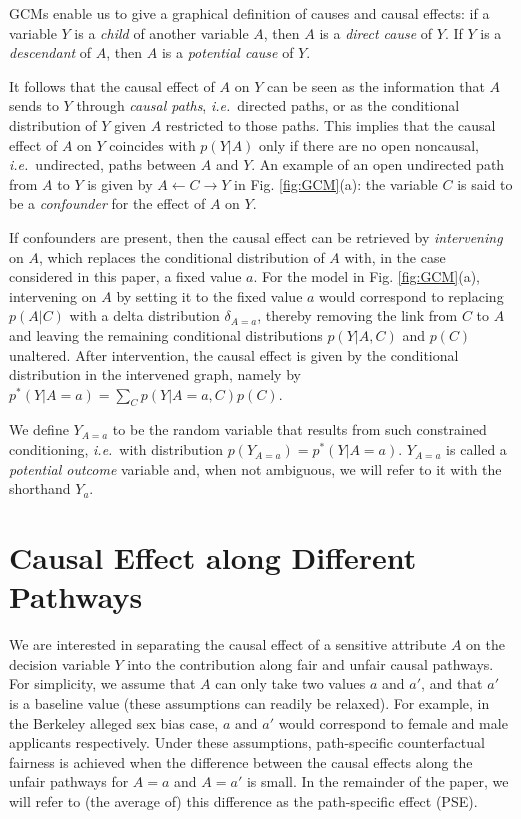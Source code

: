 \documentclass{article}
\newcommand{\figref}[1]{Fig. \ref{#1}}
\newcommand{\ie}{\emph{i.e.}}
\begin{document}
GCMs enable us to give a graphical definition of causes and causal effects: if a variable $Y$ is a \emph{child} of another variable $A$, then $A$ is a \emph{direct cause} of $Y$. 
If $Y$ is a \emph{descendant} of $A$, then $A$ is a \emph{potential cause} of $Y$. 

It follows that the causal effect of $A$ on $Y$ can be seen as the information that $A$ sends to $Y$ through \emph{causal paths}, \ie~directed paths,
or as the conditional distribution of $Y$ given $A$ restricted to those paths. This implies that the causal effect of $A$ on $Y$ coincides with $p(Y|A)$ only if 
there are no open noncausal, \ie~undirected, paths between $A$ and $Y$. An example of an open undirected path from $A$ to $Y$ is given by $A\leftarrow C \rightarrow Y$ in \figref{fig:GCM}(a): 
the variable $C$ is said to be a \emph{confounder} for the effect of $A$ on $Y$. 

If confounders are present, then the causal effect can be retrieved by \emph{intervening} on $A$, 
which replaces the conditional distribution of $A$ with, in the case considered in this paper, a fixed value $a$. 
For the model in \figref{fig:GCM}(a), intervening on $A$ by setting it to the fixed value $a$ would correspond to replacing $p(A|C)$ with a delta distribution $\delta_{A=a}$, thereby removing the link from $C$ to $A$ and leaving the remaining conditional distributions $p(Y|A,C)$ and $p(C)$ unaltered.
After intervention, the causal effect is given by the conditional distribution in the intervened graph, namely by $p^*(Y|A=a) = \sum_C p(Y|A=a,C)p(C)$.

We define $Y_{A=a}$ to be the random variable that results from such constrained conditioning, \ie~with distribution $p(Y_{A=a}) = p^*(Y|A=a)$. $Y_{A=a}$ is called a \emph{potential outcome} variable and, when not ambiguous, we will refer to it with the shorthand $Y_a$.

\section{Causal Effect along Different Pathways}
We are interested in separating the causal effect of a sensitive attribute $A$ on the decision variable $Y$ into the contribution along fair and unfair causal pathways.
For simplicity, we assume that $A$ can only take two values $a$ and $a'$, and that $a'$ is a baseline value (these assumptions can readily be relaxed). For example, in the Berkeley alleged sex bias case, 
$a$ and $a'$ would correspond to female and male applicants respectively. 
Under these assumptions, path-specific counterfactual fairness is achieved when the difference between the causal effects along the unfair pathways for $A=a$ and $A=a'$ is small. 
In the remainder of the paper, we will refer to (the average of) this difference as the path-specific effect (PSE). 
\end{document}
